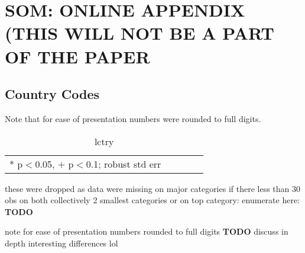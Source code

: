 \documentclass[10pt, letterpaper]{article}
\begin{document}






\section{SOM: ONLINE APPENDIX (THIS WILL NOT BE A PART OF THE PAPER}

\subsection{Country Codes}

Note that for ease of presentation numbers were rounded to full digits. 
\begin{spacing}{.9} \begin{table}[H]\centering \caption{.} \label{d1} \begin{scriptsize} \begin{tabular}{lllll}\hline  \hline   * p$<$0.05, $+$ p$<$0.1; robust std err \end{tabular}\end{scriptsize}\caption{lctry}\end{table} \end{spacing}
these were dropped as data were missing on major categories if there less than
30 obs on both collectively 2 smallest categories or on top category: enumerate here:
\textbf{TODO}

note for ease of presentation numbers rounded to full digits
\textbf{TODO} discuss in depth interesting differences lol
\end{document}
